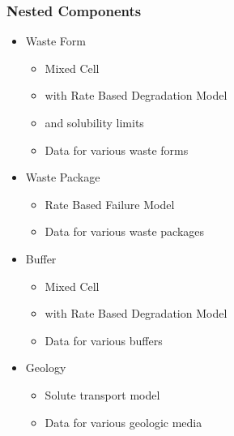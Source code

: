 \begin{frame}
  \frametitle{Nested Components}
  \begin{itemize}
    \item Waste Form
      \begin{itemize}
        \item Mixed Cell 
        \item with Rate Based Degradation Model
        \item and solubility limits
        \item Data for various waste forms
      \end{itemize}
    \item Waste Package
      \begin{itemize}
        \item Rate Based Failure Model
        \item Data for various waste packages
      \end{itemize}
    \item Buffer
      \begin{itemize}
        \item Mixed Cell 
        \item with Rate Based Degradation Model
        \item Data for various buffers
      \end{itemize}
    \item Geology
      \begin{itemize}
        \item Solute transport model
        \item Data for various geologic media
      \end{itemize}
  \end{itemize}
\end{frame}

